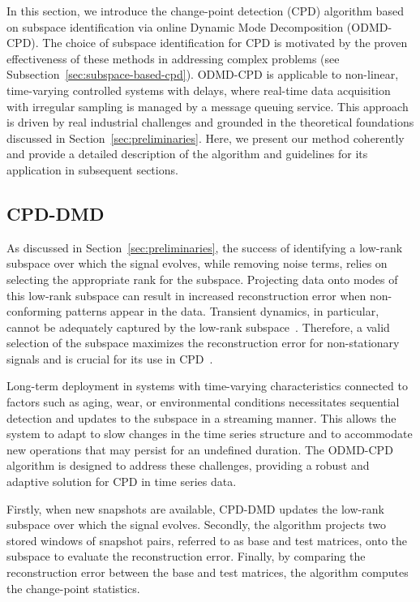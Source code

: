 In this section, we introduce the change-point detection (CPD) algorithm based on subspace identification via online Dynamic Mode Decomposition (ODMD-CPD). The choice of subspace identification for CPD is motivated by the proven effectiveness of these methods in addressing complex problems (see Subsection~\ref{sec:subspace-based-cpd}). ODMD-CPD is applicable to non-linear, time-varying controlled systems with delays, where real-time data acquisition with irregular sampling is managed by a message queuing service. This approach is driven by real industrial challenges and grounded in the theoretical foundations discussed in Section~\ref{sec:preliminaries}. Here, we present our method coherently and provide a detailed description of the algorithm and guidelines for its application in subsequent sections.

\subsection{CPD-DMD}
As discussed in Section~\ref{sec:preliminaries}, the success of identifying a low-rank subspace over which the signal evolves, while removing noise terms, relies on selecting the appropriate rank for the subspace. Projecting data onto modes of this low-rank subspace can result in increased reconstruction error when non-conforming patterns appear in the data. Transient dynamics, in particular, cannot be adequately captured by the low-rank subspace~\citep{Kuehn2011, Gottwald2020}. Therefore, a valid selection of the subspace maximizes the reconstruction error for non-stationary signals and is crucial for its use in CPD~\citep{Moskvina2003}.

Long-term deployment in systems with time-varying characteristics connected to factors such as aging, wear, or environmental conditions necessitates sequential detection and updates to the subspace in a streaming manner. This allows the system to adapt to slow changes in the time series structure and to accommodate new operations that may persist for an undefined duration. The ODMD-CPD algorithm is designed to address these challenges, providing a robust and adaptive solution for CPD in time series data.

Firstly, when new snapshots are available, CPD-DMD updates the low-rank subspace over which the signal evolves. Secondly, the algorithm projects two stored windows of snapshot pairs, referred to as base and test matrices, onto the subspace to evaluate the reconstruction error. Finally, by comparing the reconstruction error between the base and test matrices, the algorithm computes the change-point statistics.

